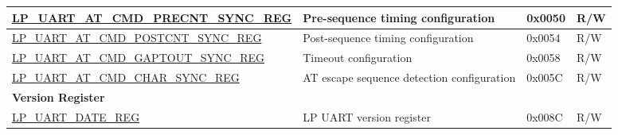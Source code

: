 \begin{longtable}{ | p{6cm} | p{7.2cm} | p{1.3cm} | p{1cm} | }
\hyperref[regdesc:LPUARTATCMDPRECNTSYNCREG]{LP\_UART\_AT\_CMD\_PRECNT\_SYNC\_REG} & Pre-sequence timing configuration & 0x0050 & R/W \\ \hline
\hyperref[regdesc:LPUARTATCMDPOSTCNTSYNCREG]{LP\_UART\_AT\_CMD\_POSTCNT\_SYNC\_REG} & Post-sequence timing configuration & 0x0054 & R/W \\ \hline
\hyperref[regdesc:LPUARTATCMDGAPTOUTSYNCREG]{LP\_UART\_AT\_CMD\_GAPTOUT\_SYNC\_REG} & Timeout configuration & 0x0058 & R/W \\ \hline
\hyperref[regdesc:LPUARTATCMDCHARSYNCREG]{LP\_UART\_AT\_CMD\_CHAR\_SYNC\_REG} & AT escape sequence detection configuration & 0x005C & R/W \\ \hline
\multicolumn{4}{|l|}{\textbf{Version Register}} \\ \hline
\hyperref[regdesc:LPUARTDATEREG]{LP\_UART\_DATE\_REG} & LP UART version register & 0x008C & R/W \\ \hline

\end{longtable}
